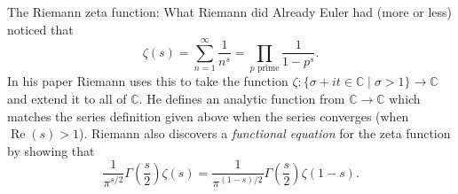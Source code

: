 \documentclass{beamer}
\begin{document}
\begin{frame}{The Riemann zeta function: What Riemann did}
Already Euler had (more or less) noticed that 
\[\zeta(s) = \sum_{n=1}^{\infty}\frac{1}{n^s} = \prod_{p \text{ prime}}\frac{1}{1-p^s}.\]
\pause In his paper Riemann uses this to take the function $\zeta\colon \{\sigma + it \in\mathbb{C}\mid \sigma > 1\} \to \mathbb{C}$ and extend it to all of $\mathbb{C}$.
\pause He defines an analytic function from $\mathbb{C} \to \mathbb{C}$ which matches the series definition given above when the series converges (when $\operatorname{Re}(s) > 1$).
\pause Riemann also discovers a \emph{functional equation} for the zeta function by showing that
\[ \frac{1}{\pi^{s/2}} \Gamma\left(\frac{s}{2}\right)\zeta(s) = \frac{1}{\pi^{(1-s)/2}} \Gamma\left(\frac{s}{2}\right) \zeta(1-s).\]
\end{frame}
\end{document}
